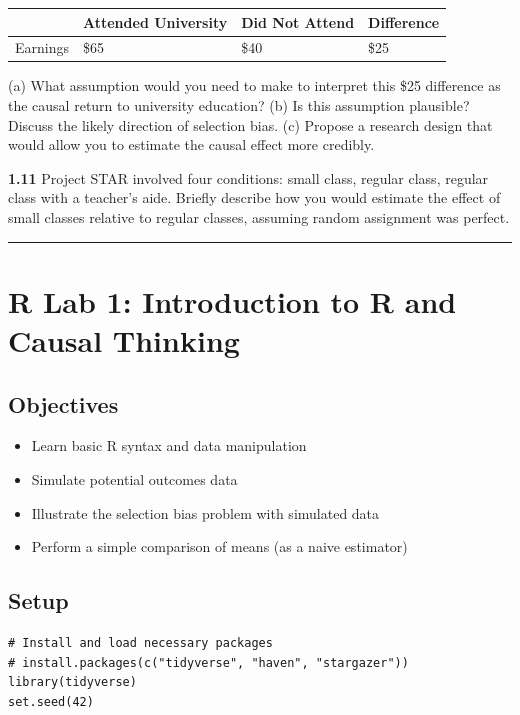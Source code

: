 \begin{center}
\begin{tabular}{@{} l l l l @{}}
\toprule
\textbf{} & \textbf{Attended University} & \textbf{Did Not Attend} & \textbf{Difference} \\
\midrule
Earnings & \$65 & \$40 & \$25 \\
\bottomrule
\end{tabular}
\end{center}

(a) What assumption would you need to make to interpret this \$25 difference as the causal return to university education?
(b) Is this assumption plausible? Discuss the likely direction of selection bias.
(c) Propose a research design that would allow you to estimate the causal effect more credibly.

\textbf{1.11} Project STAR involved four conditions: small class, regular class, regular class with a teacher's aide. Briefly describe how you would estimate the effect of small classes relative to regular classes, assuming random assignment was perfect.

\medskip\hrule\medskip

\section{R Lab 1: Introduction to R and Causal Thinking}

\subsection{Objectives}
\begin{itemize}
\item Learn basic R syntax and data manipulation
\item Simulate potential outcomes data
\item Illustrate the selection bias problem with simulated data
\item Perform a simple comparison of means (as a naive estimator)
\end{itemize}

\subsection{Setup}

\begin{lstlisting}
# Install and load necessary packages
# install.packages(c("tidyverse", "haven", "stargazer"))
library(tidyverse)
set.seed(42)
\end{lstlisting}

